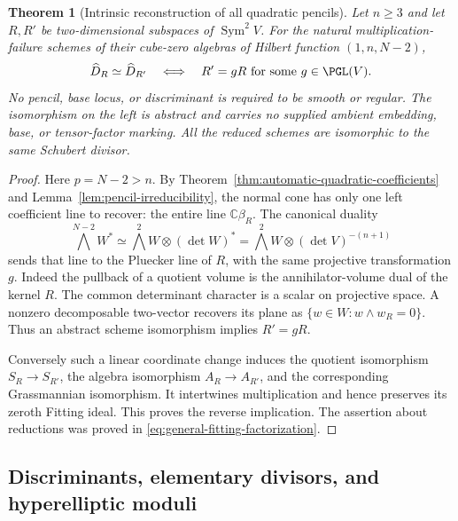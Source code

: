 \documentclass[11pt,reqno]{amsart}
\numberwithin{equation}{section}
\newtheorem{theorem}{Theorem}[section]
\theoremstyle{definition}\newtheorem{definition}[theorem]{Definition}
\theoremstyle{remark}\newtheorem{remark}[theorem]{Remark}
\newcommand{\C}{\mathbb C}\newcommand{\Q}{\mathbb Q}
\DeclareMathOperator{\Sym}{Sym}\DeclareMathOperator{\Gr}{Gr}
\begin{document}
\begin{theorem}[Intrinsic reconstruction of all quadratic pencils]
\label{thm:natural-pencil-reconstruction}
Let \(n\ge3\) and let \(R,R'\) be two-dimensional subspaces
of \(\Sym^2V\).  For the natural multiplication-failure schemes
of their cube-zero algebras of Hilbert function \((1,n,N-2)\),
\begin{equation}\label{eq:natural-pencil-torelli}
 \widehat D_R\simeq\widehat D_{R'}
 \quad\Longleftrightarrow\quad
 R'=gR\text{ for some }g\in\PGL(V).
\end{equation}
No pencil, base locus, or discriminant is required to be smooth or
regular.  The isomorphism on the left is abstract and carries no
supplied ambient embedding, base, or tensor-factor marking.  All the
reduced schemes are isomorphic to the same Schubert divisor.
\end{theorem}
\begin{proof}
Here \(p=N-2>n\).  By
Theorem~\ref{thm:automatic-quadratic-coefficients} and
Lemma~\ref{lem:pencil-irreducibility}, the normal cone has only one
left coefficient line to recover: the entire line \(\C\beta_R\).
The canonical duality
\begin{equation}\label{eq:pencil-exterior-duality}
 \bigwedge^{N-2}W^*\simeq
       \bigwedge^2W\otimes(\det W)^*
       =\bigwedge^2W\otimes(\det V)^{-(n+1)}
\end{equation}
sends that line to the Pluecker line of \(R\), with the same
projective transformation \(g\).  Indeed the pullback of a
quotient volume is the annihilator-volume dual of the kernel
\(R\).  The common determinant character is a scalar on
projective space.  A nonzero decomposable two-vector recovers its
plane as \(\{w\in W:w\wedge w_R=0\}\).  Thus an abstract
scheme isomorphism implies \(R'=gR\).

Conversely such a linear coordinate change induces the quotient
isomorphism \(S_R\to S_{R'}\), the algebra isomorphism
\(A_R\to A_{R'}\), and the corresponding Grassmannian isomorphism.
It intertwines multiplication and hence preserves its zeroth Fitting
ideal.  This proves the reverse implication.  The assertion about
reductions was proved in \eqref{eq:general-fitting-factorization}.
\end{proof}

\subsection{Discriminants, elementary divisors, and hyperelliptic moduli}
\end{document}
